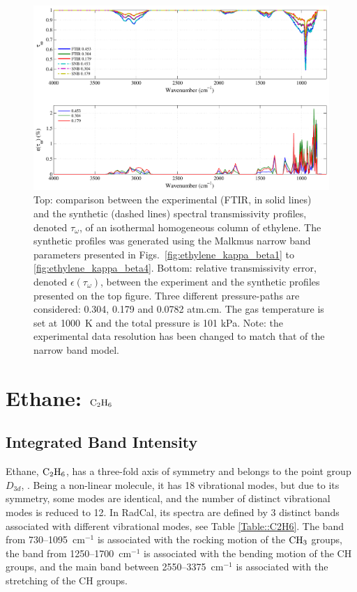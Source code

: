 \begin{figure}[p]
\includegraphics[width=\textwidth]{Figures/Comparison_Fit_Ethylene_MALKMUS_Temp1000K.pdf}
\caption{Top: comparison between the experimental (FTIR, in solid lines) and the synthetic (dashed lines) spectral transmissivity profiles, denoted $\tau_{\omega}$, of an isothermal homogeneous column of ethylene. The synthetic profiles was generated using the Malkmus narrow band parameters presented in Figs.~\ref{fig:ethylene_kappa_beta1} to \ref{fig:ethylene_kappa_beta4}. Bottom: relative transmissivity error, denoted $\epsilon{(\tau_{\omega})}$, between the experiment and the synthetic profiles presented on the top figure. Three different pressure-paths are considered: 0.304, 0.179 and 0.0782 atm.cm. The gas temperature is set at 1000~K and the total pressure is 101 kPa. Note: the experimental data resolution has been changed to match that of the narrow band model. \label{fig:ethylene_SNBVerify_1000K}}
\end{figure}


\clearpage

\section{Ethane: $\rm C_2H_6$}

\subsection{Integrated Band Intensity}

Ethane, $\rm C_2H_6$, has a three-fold axis of symmetry and belongs to the point group $D_{3d}$, \cite{Herzberg1949}. Being a non-linear molecule, it has 18 vibrational modes, but due to its symmetry, some modes are identical, and the number of distinct vibrational modes is reduced to 12. In RadCal, its spectra are defined by 3 distinct bands associated with different vibrational modes, see Table \ref{Table::C2H6}. The band from 730--1095~cm$^{-1}$ is associated with the rocking motion of the $\rm CH_3$ groups, the band from 1250--1700~cm$^{-1}$ is associated with the bending motion of the CH groups, and the main band between 2550--3375~cm$^{-1}$ is associated with the stretching of the CH groups.

